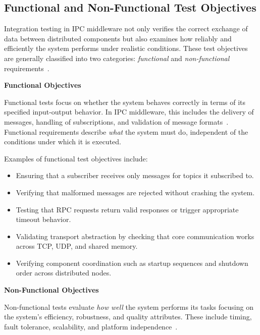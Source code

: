 \subsection{Functional and Non-Functional Test Objectives}

Integration testing in IPC middleware not only verifies the correct exchange of data between distributed components but also examines how reliably and efficiently the system performs under realistic conditions. These test objectives are generally classified into two categories: \textit{functional} and \textit{non-functional} requirements~\cite{gorton2006software, tanenbaum2017, spillner2019softwaretest}.

\vspace{1em}
\textbf{Functional Objectives}

\vspace{0.4em}
Functional tests focus on whether the system behaves correctly in terms of its specified input-output behavior. In IPC middleware, this includes the delivery of messages, handling of subscriptions, and validation of message formats~\cite{burnstein2003practical, spillner2019softwaretest}. Functional requirements describe \textit{what} the system must do, independent of the conditions under which it is executed.

\vspace{1em}
Examples of functional test objectives include:

\begin{itemize}
	\item Ensuring that a subscriber receives only messages for topics it subscribed to.
	\item Verifying that malformed messages are rejected without crashing the system.
	\item Testing that RPC requests return valid responses or trigger appropriate timeout behavior.
	\item Validating transport abstraction by checking that core communication works across TCP, UDP, and shared memory.
	\item Verifying component coordination such as startup sequences and shutdown order across distributed nodes.
\end{itemize}

\vspace{1em}
\textbf{Non-Functional Objectives}

\vspace{0.4em}
Non-functional tests evaluate \textit{how well} the system performs its tasks focusing on the system’s efficiency, robustness, and quality attributes. These include timing, fault tolerance, scalability, and platform independence~\cite{stallings2018, spillner2019softwaretest}.

